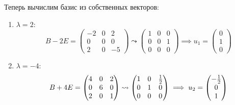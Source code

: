 Теперь вычислим базис из собственных векторов:
\begin{enumerate}
    \item $\lambda = 2:$
          \[
              B - 2E =
              \begin{pmatrix}
                  -2 & 0 & 2  \\
                  0  & 0 & 0  \\
                  2  & 0 & -5
              \end{pmatrix}
              \leadsto
              \begin{pmatrix}
                  1 & 0 & 0 \\
                  0 & 0 & 1 \\
                  0 & 0 & 0
              \end{pmatrix}
              \implies
              u_1 =
              \begin{pmatrix}
                  0 \\
                  1 \\
                  0
              \end{pmatrix}
          \]

    \item $\lambda = -4:$
          \[
              B + 4E =
              \begin{pmatrix}
                  4 & 0 & 2 \\
                  0 & 6 & 0 \\
                  2 & 0 & 1
              \end{pmatrix}
              \leadsto
              \begin{pmatrix}
                  1 & 0 & \frac{1}{2} \\
                  0 & 1 & 0        \\
                  0 & 0 & 0
              \end{pmatrix}
              \implies
              u_2 =
              \begin{pmatrix}
                  -\frac{1}{2} \\
                  0         \\
                  1
              \end{pmatrix}
          \]


\end{enumerate}
